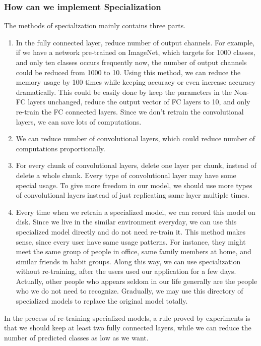 \documentclass{article}
\begin{document}
\subsubsection{How can we implement Specialization}
The methods of specialization mainly contains three parts.
\begin{enumerate}
    \item In the fully connected layer, reduce number of output channels. For example, if we have a network pre-trained on ImageNet, which targets for 1000 classes, and only ten classes occurs frequently now, the number of output channels could be reduced from 1000 to 10. Using this method, we can reduce the memory usage by 100 times while keeping accuracy or even increase accuracy dramatically. This could be easily done by keep the parameters in the Non-FC layers unchanged, reduce the output vector of FC layers to 10, and only re-train the FC connected layers. Since we don't retrain the convolutional layers, we can save lots of computations.
    
    
    \item We can reduce number of convolutional layers, which could reduce number of computations proportionally.
    
    \item For every chunk of convolutional layers, delete one layer per chunk, instead of delete a whole chunk. Every type of convolutional layer may have some special usage. To give more freedom in our model, we should use more types of convolutional layers instead of just replicating same layer multiple times.
    
    \item Every time when we retrain a specialized model, we can record this model on disk. Since we live in the similar environment everyday, we can use this specialized model directly and do not need re-train it. This method makes sense, since every user have same usage patterns. For instance, they might meet the same group of people in office, same family members at home, and similar friends in habit groups. Along this way, we can use specialization without re-training, after the users used our application for a few days. Actually, other people who appears seldom in our life generally are the people who we do not need to recognize. Gradually, we may use this directory of specialized models to replace the original model totally.
\end{enumerate}
In the process of re-training specialized models, a rule proved by experiments is that we should keep at least two fully connected layers, while we can reduce the number of predicted classes as low as we want.
\end{document}
